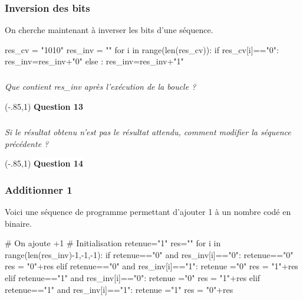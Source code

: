 \documentclass[10pt]{article}
\newif\ifprof
\begin{document}
\subsubsection{Inversion des bits}
On cherche maintenant à inverser les bits d'une séquence.

\begin{py}
\begin{minipage}[c]{.75\linewidth}
\begin{python}
res_cv = "1010"
res_inv = ""
for i in range(len(res_cv)):
    if res_cv[i]=="0":
        res_inv=res_inv+"0"
    else :
        res_inv=res_inv+"1"
\end{python}
\end{minipage}
\end{py}

\newpage

\subparagraph{}
\textit{Que contient \textsf{res\_inv} après l'exécution de la boucle ?}

\vspace{.3cm}
\noindent\boxput*(-.85,1){
\colorbox{white}{\textbf{Question 13}}}{
\setlength{\fboxsep}{10pt}
\fbox{\begin{minipage}{.95\linewidth}
\ifprof
\else
\usebox{\codebox}
\vspace{2cm}
\fi
\end{minipage}}}


\subparagraph{}
\textit{Si le résultat obtenu n'est pas le résultat attendu, comment modifier la séquence précédente ?}

\vspace{.3cm}
\noindent\boxput*(-.85,1){
\colorbox{white}{\textbf{Question 14}}}{
\setlength{\fboxsep}{10pt}
}


\subsubsection{Additionner 1}
Voici une séquence de programme permettant d'ajouter 1 à un nombre codé en binaire.


\begin{py}
\begin{minipage}[c]{.75\linewidth}
\begin{python}
# On ajoute +1
# Initialisation
retenue="1"
res=""
for i in range(len(res_inv)-1,-1,-1):
    if retenue=="0" and res_inv[i]=="0":
        retenue=="0"
        res = "0"+res
    elif retenue=="0" and res_inv[i]=="1":
        retenue ="0"
        res = "1"+res
    elif retenue=="1" and res_inv[i]=="0":
        retenue ="0"
        res = "1"+res
    elif retenue=="1" and res_inv[i]=="1":
        retenue ="1"
        res = "0"+res
\end{python}
\end{minipage}

\end{py}
  
\end{document}
